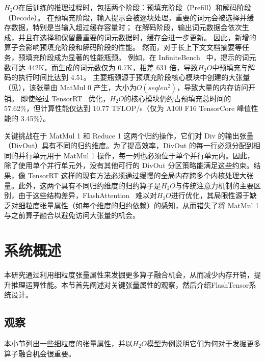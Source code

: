 \(H_{2}O\)在后训练的推理过程时，包括两个阶段：预填充阶段（Prefill）和解码阶段（Decode）。
在预填充阶段，输入提示会被逐块处理，重要的词元会被选择并缓存数据，特别是当输入超过缓存容量时；
在解码阶段，输出词元数据会依次生成，并且在选择和保留最重要的词元数据时，缓存会进一步更新。
因此，新增的算子会影响预填充阶段和解码阶段的性能。
然而，对于长上下文文档摘要等任务，预填充阶段成为显著的性能瓶颈。
例如，在 InfiniteBench~\cite{zhang2024infinitebench} 中，提示的词元数可达 442K，而生成的词元数仅为 0.7K，相差 631 倍，导致\(H_{2}O\)中预填充与解码的执行时间比达到 4.51。
主要瓶颈源于预填充阶段核心模块中创建的大张量（见），该张量由 MatMul 0 产生，大小为\(O(seqlen ^{2})\)，导致大量的内存访问开销。
即使经过 TensorRT~\cite{tensorrt} 优化，\(H_{2}O\)的核心模块仍约占预填充总时间的 57.62\%，但计算性能仅达到 10.77 TFLOP/s（仅为 A100 F16 TensorCore 峰值性能的 3.45\%）。

关键挑战在于 MatMul 1 和 Reduce 1 这两个归约操作，它们对 Div 的输出张量（DivOut）具有不同的归约维度。为了提高效率，DivOut 的每一行必须分配到相同的并行单元用于 MatMul 1 操作，每一列也必须位于单个并行单元内。因此，除了使用单个并行单元外，没有其他可行的 DivOut 分区策略能满足这些约束。结果，像 TensorRT 这样的现有方法必须通过缓慢的全局内存跨多个内核处理大张量。此外，这两个具有不同归约维度的归约算子是\(H_{2}O\)与传统注意力机制的主要区别，由于这些结构差异，FlashAttention~\cite{dao2023flashattention} 难以对\(H_{2}O\)进行优化，其局限性源于缺乏对细粒度张量属性（如每个维度的归约依赖）的感知，从而错失了将 MatMul 1 与之前算子融合以避免访问大张量的机会。

\section{系统概述}

本研究通过利用细粒度张量属性来发掘更多算子融合机会，从而减少内存开销，提升推理运算性能。本节首先阐述对关键张量属性的观察，然后介绍FlashTensor系统设计。

\subsection{观察}

本小节列出一些细粒度的张量属性，并以\(H_{2}O\)模型为例说明它们为何对于发掘更多算子融合机会很重要。

